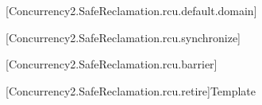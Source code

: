 [Concurrency2.SafeReclamation.rcu.default.domain]{}

[Concurrency2.SafeReclamation.rcu.synchronize]{}

[Concurrency2.SafeReclamation.rcu.barrier]{}

[Concurrency2.SafeReclamation.rcu.retire]{Template }

